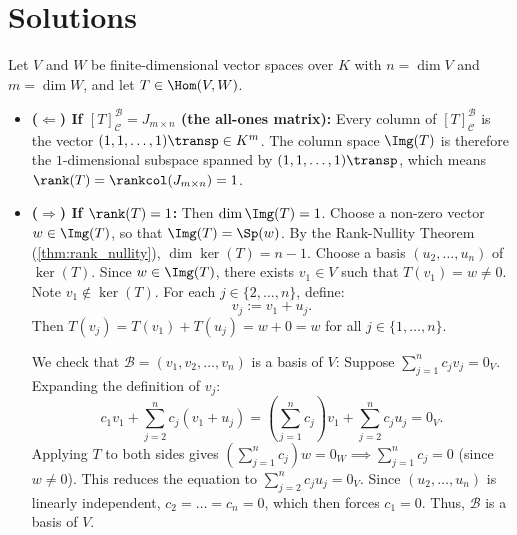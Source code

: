 \section{Solutions}\label{sec:solutions_column_and_row_rank}

\begin{exercisesolution}
\label{sol:rank_one_all_ones_matrix}
Let $V$ and $W$ be finite-di\-men\-sional vector spaces over $K$ with $n = \dim V$ and $m = \dim W$, and let $T \in \Hom(V, W)$.

\begin{itemize}
    \item \textbf{($\Leftarrow$) If $[T]_{\mathcal{C}}^{\mathcal{B}} = J_{m \times n}$ (the all-ones matrix):}
    Every column of $[T]_{\mathcal{C}}^{\mathcal{B}}$ is the vector $(1, 1, \dots, 1)\transp \in K^m$. The column space $\Img(T)$ is therefore the $1$-dimensional subspace spanned by $(1, 1, \dots, 1)\transp$, which means $\rank(T) = \rankcol(J_{m \times n}) = 1$.

    \item \textbf{($\Rightarrow$) If $\rank(T) = 1$:}
    Then $\dim \Img(T) = 1$. Choose a non-zero vector $w \in \Img(T)$, so that $\Img(T) = \Sp(w)$.
    By the Rank-Nullity Theorem (\cref{thm:rank_nullity}), $\dim \ker(T) = n - 1$. Choose a basis $(u_2, \dots, u_n)$ of $\ker(T)$.
    Since $w \in \Img(T)$, there exists $v_1 \in V$ such that $T(v_1) = w \ne 0$. Note $v_1 \notin \ker(T)$.
    For each $j \in \{2, \dots, n\}$, define:
    \[
    v_j := v_1 + u_j.
    \]
    Then $T(v_j) = T(v_1) + T(u_j) = w + 0 = w$ for all $j \in \{1, \dots, n\}$.
    
    We check that $\mathcal{B} = (v_1, v_2, \dots, v_n)$ is a basis of $V$:
    Suppose $\sum_{j=1}^n c_j v_j = 0_V$. Expanding the definition of $v_j$:
    \[
    c_1 v_1 + \sum_{j=2}^n c_j (v_1 + u_j) = \left(\sum_{j=1}^n c_j\right) v_1 + \sum_{j=2}^n c_j u_j = 0_V.
    \]
    Applying $T$ to both sides gives $\left(\sum_{j=1}^n c_j\right) w = 0_W \implies \sum_{j=1}^n c_j = 0$ (since $w \ne 0$).
    This reduces the equation to $\sum_{j=2}^n c_j u_j = 0_V$. Since $(u_2, \dots, u_n)$ is linearly independent, $c_2 = \dots = c_n = 0$, which then forces $c_1 = 0$. Thus, $\mathcal{B}$ is a basis of $V$.


\end{itemize}
\end{exercisesolution}
